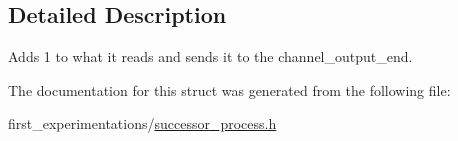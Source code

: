 \subsection{Detailed Description}
Adds 1 to what it reads and sends it to the channel\-\_\-output\-\_\-end. 

The documentation for this struct was generated from the following file\-:\begin{DoxyCompactItemize}
\item 
first\-\_\-experimentations/\hyperlink{successor__process_8h}{successor\-\_\-process.\-h}\end{DoxyCompactItemize}
